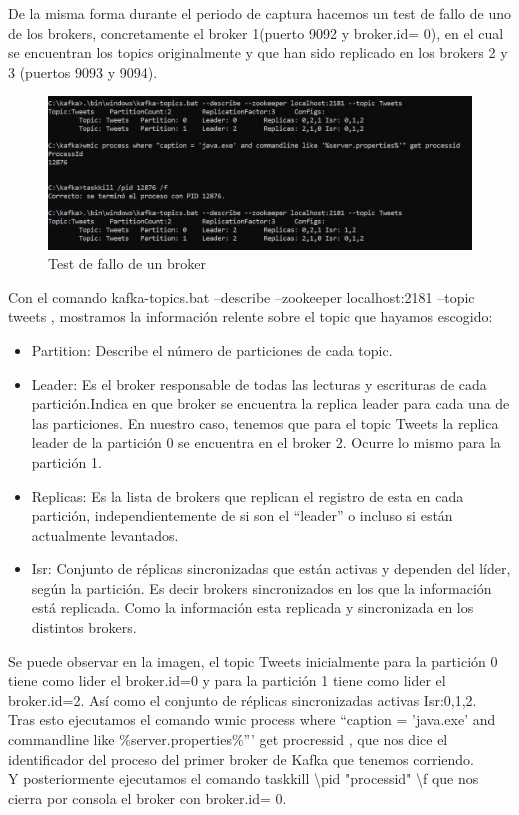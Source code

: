 \documentclass[12pt, a4paper, twoside]{article}
\newcommand{\quotes}[1]{``#1''}
\begin{document}
\newpage
De la misma forma durante el periodo de captura hacemos un test de fallo de uno de los brokers, concretamente el broker 1(puerto 9092 y broker.id= 0), en el cual se encuentran los topics originalmente y que han sido replicado en los brokers 2 y 3 (puertos 9093 y 9094).


\begin{figure}[h]
		\centering
		\includegraphics[width=1.1\linewidth]{test_brokerdown}
		\caption{Test de fallo de un broker}
			\end{figure}


Con el comando kafka-topics.bat --describe --zookeeper localhost:2181 --topic tweets , mostramos la información relente sobre el topic que hayamos escogido:
\begin{itemize}
\item Partition: Describe el número de particiones de cada topic.
\item Leader:  Es  el  broker  responsable  de  todas  las  lecturas  y  escrituras  de  cada partición.Indica en que broker se encuentra la replica leader para cada una de las particiones. En nuestro caso, tenemos que para el topic Tweets la replica leader de la partición 0 se encuentra en el broker 2. Ocurre lo mismo para la partición 1.
\item Replicas:  Es  la  lista  de  brokers  que  replican  el  registro  de  esta en cada  partición, independientemente  de  si  son  el  “leader”    o  incluso si  están  actualmente levantados. 
\item Isr: Conjunto de réplicas sincronizadas que están activas y dependen del líder, según la partición. Es decir brokers sincronizados en los que la información está replicada. Como la información esta replicada y sincronizada en los distintos brokers.
\end{itemize}


Se puede observar en la imagen, el topic Tweets inicialmente  para la partición 0 tiene como lider el broker.id=0 y para la partición 1 tiene como lider el broker.id=2. Así como el conjunto de réplicas sincronizadas activas Isr:0,1,2.\\
\newpage
Tras esto ejecutamos el comando wmic process where \quotes{caption = 'java.exe' and commandline like \%server.properties\%'}  get procressid , que nos dice el identificador del proceso del primer broker de Kafka que tenemos corriendo. \\
Y posteriormente ejecutamos el comando taskkill \textbackslash pid "processid" \textbackslash f que nos cierra por consola el broker con broker.id= 0.\\
\end{document}
